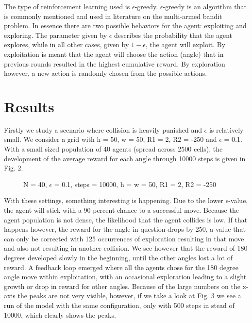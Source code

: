 \documentclass[a4paper]{article}
\begin{document}
The type of reinforcement learning used is $\epsilon$-greedy. $\epsilon$-greedy is an algorithm that is commonly mentioned and used in literature on the multi-armed bandit problem. In essence there are two possible behaviors for the agent: exploiting and exploring. The parameter given by $\epsilon$ describes the probability that the agent explores, while in all other cases, given by $1-\epsilon$, the agent will exploit. By exploitation is meant that the agent will choose the action (angle) that in previous rounds resulted in the highest cumulative reward. By exploration however, a new action is randomly chosen from the possible actions.

\section{Results}
Firstly we study a scenario where collision is heavily punished and $\epsilon$ is relatively small. We consider a grid with h = 50, w = 50, R1 = 2, R2 = -250 and $\epsilon$ = 0.1. With a small sized population of 40 agents (spread across 2500 cells), the development of the average reward for each angle through 10000 steps is given in Fig. 2.
\begin{figure}[h]
\caption{N = 40, $\epsilon$ = 0.1, steps = 10000, h = w = 50, R1 = 2, R2 = -250} 
\end{figure}
With these settings, something interesting is happening. Due to the lower $\epsilon$-value, the agent will stick with a 90 percent chance to a successful move. Because the agent population is not dense, the likelihood that the agent collides is low. If that happens however, the reward for the angle in question drops by 250, a value that can only be corrected with 125 occurrences of exploration resulting in that move and also not resulting in another collision. We see however that the reward of 180 degrees developed slowly in the beginning, until the other angles lost a lot of reward. A feedback loop emerged where all the agents chose for the 180 degree angle move within exploitation, with an occasional exploration leading to a slight growth or drop in reward for other angles. Because of the large numbers on the x-axis the peaks are not very visible, however, if we take a look at Fig. 3 we see a run of the model with the same configuration, only with 500 steps in stead of 10000, which clearly shows the peaks.
\newline
\end{document}
